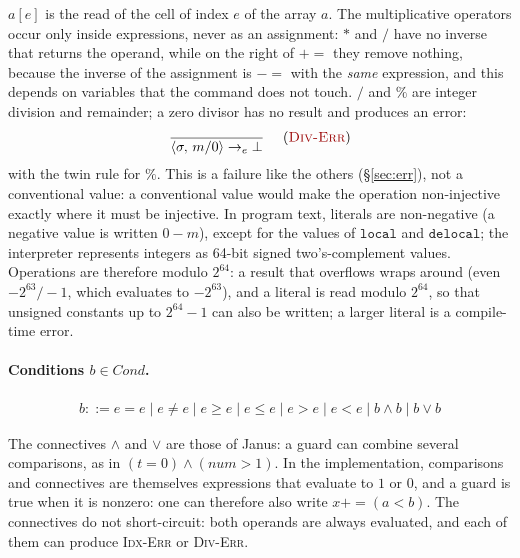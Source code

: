 \noindent
$a[e]$ is the read of the cell of index $e$ of the array $a$. The
multiplicative operators occur only inside expressions, never as an assignment:
$*$ and $/$ have no inverse that returns the operand, while on the right of
$\mathbin{+\!\!=}$ they remove nothing, because the inverse of the assignment is
$\mathbin{-\!\!=}$ with the \emph{same} expression, and this depends on
variables that the command does not touch. $/$ and $\%$ are integer division and
remainder; a zero divisor has no result and produces an error:
\[
\dfrac{}{\cfg{m / 0}{\sigma} \toe \err}\ \rnameerr{Div-Err}
\]
with the twin rule for $\%$. This is a failure like the others
(\S\ref{sec:err}), not a conventional value: a conventional value
would make the operation non-injective exactly where it must be injective.
In program text, literals are non-negative (a negative value is
written $0 - m$), except for the values of $\mathtt{local}$ and $\mathtt{delocal}$;
the interpreter represents integers as 64-bit signed two's-complement values.
Operations are therefore modulo $2^{64}$: a result that overflows
wraps around (even $-2^{63} / -1$, which evaluates to $-2^{63}$), and a literal is read
modulo $2^{64}$, so that unsigned constants up to
$2^{64}-1$ can also be written; a larger literal is a compile-time error.

\paragraph{Conditions $b \in \mathit{Cond}$.}
\begin{align*}
b ::= e = e \mid e \neq e \mid e \geq e \mid e \leq e \mid e > e \mid e < e
  \mid b \land b \mid b \lor b
\end{align*}

\noindent
The connectives $\land$ and $\lor$ are those of Janus: a guard can combine
several comparisons, as in $(t = 0) \land (\mathit{num} > 1)$. In the implementation, comparisons and connectives are
themselves expressions that evaluate to $1$ or $0$, and a guard is true when it is
nonzero: one can therefore also write $x \mathbin{+\!\!=} (a < b)$. The
connectives do not short-circuit: both operands are always evaluated, and
each of them can produce \textsc{Idx-Err} or \textsc{Div-Err}.

